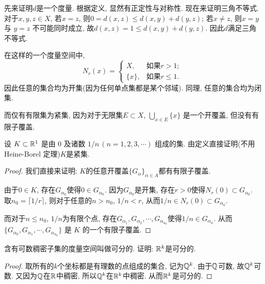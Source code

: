 \documentclass{article}
\begin{document}
\begin{solution}
    先来证明\( d \)是一个度量. 根据定义, 显然有正定性与对称性. 现在来证明三角不等式. 对于\( x,y,z\in X \), 若\( x=z \), 则\( 0=d(x,z)\le d(x,y)+d(y,z) \); 若\( x\neq z \), 则\( x=y \) 与 \( y=z \) 不可能同时成立, 故\( d(x,z)=1 \le d(x,y)+d(y,z) \). 因此\( d \)满足三角不等式.\par
    在这样的一个度量空间中, 
    \[ N_r(x)=\begin{cases}
        X, & \text{如果} r>1;\\
        \{x\}, & \text{如果} r\le 1.
    \end{cases} \] 
    因此任意的集合均为开集(因为任何单点集都是某个邻域). 同理, 任意的集合均为闭集. \par
    而仅有有限集为紧集, 因为对于无限集\( E\subset X \), \( \bigcup_{x\in E}\{x\} \) 是一个开覆盖, 但没有有限子覆盖.
\end{solution}

\begin{problem}[2-12]
    设 \( K\subset \mathbb{R}^1 \) 是由 \( 0 \) 及诸数 \( 1/n\,(n=1,2,3,\cdots) \) 组成的集. 由定义直接证明(不用 Heine-Borel 定理)\( K \)是紧集.
\end{problem}

\begin{proof}
    我们直接来证明: \( K \)的任意开覆盖\( \{G_\alpha\}_{\alpha\in A} \)都有有限子覆盖. \par
    由于\( 0\in K \), 存在\( G_{\alpha_0} \)使得\( 0\in G_{\alpha_0} \). 因为\( G_{\alpha_0} \)是开集, 存在\( r>0 \)使得\( N_r(0)\subset G_{\alpha_0} \). 取\( n_0=\lceil 1/r\rceil \), 则对于任意的\( n>n_0 \), \( 1/n<r \), 从而\( 1/n\in N_r(0)\subset G_{\alpha_0} \). \par
    而对于\( n\le n_0 \), \( 1/n \)为有限个点, 存在\( G_{\alpha_1}, G_{\alpha_2}, \cdots, G_{\alpha_{n_0}} \)使得\( 1/n\in G_{\alpha_n} \). 从而 \( \{G_{\alpha_0}, G_{\alpha_1}, \cdots, G_{\alpha_{n_0}}\} \) 是 \( K \) 的一个有限子覆盖.
\end{proof}

\begin{problem}[2-22]
    含有可数稠密子集的度量空间叫做可分的. 证明: \( \mathbb{R}^k \)是可分的.
\end{problem}

\begin{proof}
    取所有的\( k \)个坐标都是有理数的点组成的集合, 记为\( \mathbb{Q}^k \). 由于\( \mathbb{Q} \)可数, 故\( \mathbb{Q}^k \)可数. 又因为\( \mathbb{Q} \)在\( \mathbb{R} \)中稠密, 所以\( \mathbb{Q}^k \)在\( \mathbb{R}^k \)中稠密. 从而\( \mathbb{R}^k \)是可分的.
\end{proof}
\end{document}
